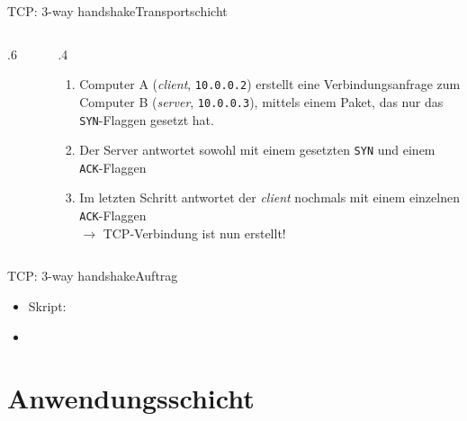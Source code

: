 \begin{frame}[fragile]{\faHandshake{} TCP: 3-way handshake}{Transportschicht}
    \begin{columns}[c]
        \begin{column}{.6\textwidth}
            \begin{figure}[H]
                \centering
                \resizebox{\textwidth}{!}{
                    
                    }
            \end{figure}
        \end{column}\vrule{}
        \begin{column}{.4\textwidth}
            \footnotesize
            \begin{enumerate}
                \item Computer A (\textit{client}, \texttt{10.0.0.2}) erstellt eine Verbindungsanfrage zum Computer B (\textit{server}, \texttt{10.0.0.3}), mittels einem Paket, das nur das \texttt{SYN}-Flaggen gesetzt hat.
                \item Der Server antwortet sowohl mit einem gesetzten \texttt{SYN} und einem \texttt{ACK}-Flaggen
                \item Im letzten Schritt antwortet der \textit{client} nochmals mit einem einzelnen \texttt{ACK}-Flaggen\\
                      $\rightarrow$ TCP-Verbindung ist nun erstellt!
            \end{enumerate}
        \end{column}
    \end{columns}
\end{frame}

\begin{frame}[fragile]{\faHandshake{} TCP: 3-way handshake}{Auftrag}
    \begin{itemize}
        \item Skript: 
        \item {}
    \end{itemize}
\end{frame}


\section{Anwendungsschicht}

